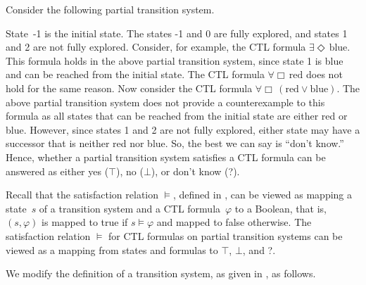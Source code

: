 \documentclass[12pt]{article}
\newcommand{\always}{\Box}
\newcommand{\eventually}{\Diamond}
\theoremstyle{definition}
\newcommand{\bottom}{\mathord{\perp}}
\begin{document}
Consider the following partial transition system.
\begin{center}
\end{center}
State~-1 is the initial state.  The states -1 and 0 are fully explored, and  states 1 and 2 are not fully explored.  Consider, for example, the CTL formula $\exists \eventually\, \mbox{blue}$.  This formula holds in the above partial transition system, since state 1 is blue and can be reached from the initial state.  The CTL formula $\forall \always\, \mbox{red}$ does not hold for the same reason.  Now consider the CTL formula $\forall \always\, (\mbox{red} \vee \mbox{blue})$.  The above partial transition system does not provide a counterexample to this formula as all states that can be reached from the initial state are either red or blue.  However, since states 1 and 2 are not fully explored, either state may have a successor that is neither red nor blue.  So, the best we can say is ``don't know.''  Hence, whether a partial transition system satisfies a CTL formula can be answered as either yes ($\top$), no ($\bottom$), or don't know (?).

Recall that the satisfaction relation $\models$, defined in \cite[Definition~6.4]{BK08}, can be viewed as mapping a state~$s$ of a transition system and a CTL formula~$\varphi$ to a Boolean, that is, $(s, \varphi)$ is mapped to true if $s \models \varphi$ and mapped to false otherwise.  The satisfaction relation $\models$ for CTL formulas on partial transition systems can be viewed as a mapping from states and formulas to $\top$, $\bottom$, and ?.

We modify the definition of a transition system, as given in \cite[Definition~2.1]{BK08}, as follows.
\end{document}
